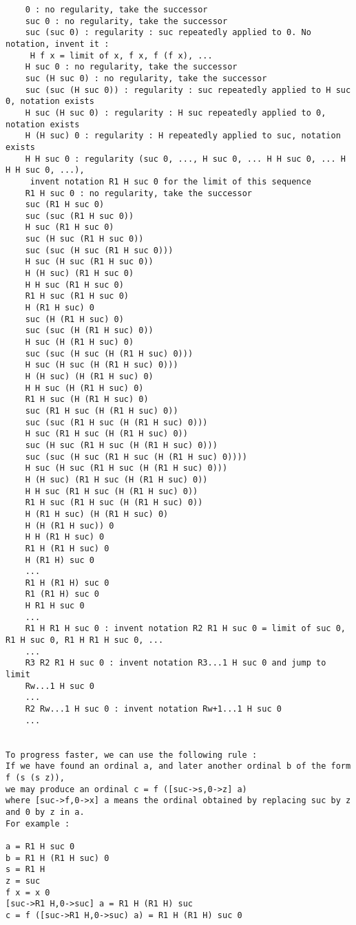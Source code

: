 \documentclass[10pt]{article}
\begin{document}
\begin{verbatim}
    0 : no regularity, take the successor
    suc 0 : no regularity, take the successor
    suc (suc 0) : regularity : suc repeatedly applied to 0. No notation, invent it : 
     H f x = limit of x, f x, f (f x), ...
    H suc 0 : no regularity, take the successor
    suc (H suc 0) : no regularity, take the successor
    suc (suc (H suc 0)) : regularity : suc repeatedly applied to H suc 0, notation exists
    H suc (H suc 0) : regularity : H suc repeatedly applied to 0, notation exists
    H (H suc) 0 : regularity : H repeatedly applied to suc, notation exists
    H H suc 0 : regularity (suc 0, ..., H suc 0, ... H H suc 0, ... H H H suc 0, ...), 
     invent notation R1 H suc 0 for the limit of this sequence
    R1 H suc 0 : no regularity, take the successor
    suc (R1 H suc 0)
    suc (suc (R1 H suc 0))
    H suc (R1 H suc 0)
    suc (H suc (R1 H suc 0))
    suc (suc (H suc (R1 H suc 0)))
    H suc (H suc (R1 H suc 0))
    H (H suc) (R1 H suc 0)
    H H suc (R1 H suc 0)
    R1 H suc (R1 H suc 0)
    H (R1 H suc) 0
    suc (H (R1 H suc) 0)
    suc (suc (H (R1 H suc) 0))
    H suc (H (R1 H suc) 0)
    suc (suc (H suc (H (R1 H suc) 0)))
    H suc (H suc (H (R1 H suc) 0)))
    H (H suc) (H (R1 H suc) 0)
    H H suc (H (R1 H suc) 0)
    R1 H suc (H (R1 H suc) 0)
    suc (R1 H suc (H (R1 H suc) 0))
    suc (suc (R1 H suc (H (R1 H suc) 0)))
    H suc (R1 H suc (H (R1 H suc) 0))
    suc (H suc (R1 H suc (H (R1 H suc) 0)))
    suc (suc (H suc (R1 H suc (H (R1 H suc) 0))))
    H suc (H suc (R1 H suc (H (R1 H suc) 0)))
    H (H suc) (R1 H suc (H (R1 H suc) 0))
    H H suc (R1 H suc (H (R1 H suc) 0))
    R1 H suc (R1 H suc (H (R1 H suc) 0))
    H (R1 H suc) (H (R1 H suc) 0)
    H (H (R1 H suc)) 0
    H H (R1 H suc) 0
    R1 H (R1 H suc) 0
    H (R1 H) suc 0
    ...
    R1 H (R1 H) suc 0
    R1 (R1 H) suc 0
    H R1 H suc 0
    ...
    R1 H R1 H suc 0 : invent notation R2 R1 H suc 0 = limit of suc 0, R1 H suc 0, R1 H R1 H suc 0, ...
    ...
    R3 R2 R1 H suc 0 : invent notation R3...1 H suc 0 and jump to limit
    Rw...1 H suc 0
    ...
    R2 Rw...1 H suc 0 : invent notation Rw+1...1 H suc 0
    ... 


To progress faster, we can use the following rule :
If we have found an ordinal a, and later another ordinal b of the form f (s (s z)), 
we may produce an ordinal c = f ([suc->s,0->z] a) 
where [suc->f,0->x] a means the ordinal obtained by replacing suc by z and 0 by z in a.
For example :

a = R1 H suc 0
b = R1 H (R1 H suc) 0
s = R1 H
z = suc
f x = x 0
[suc->R1 H,0->suc] a = R1 H (R1 H) suc
c = f ([suc->R1 H,0->suc) a) = R1 H (R1 H) suc 0


\end{verbatim}
\end{document}
